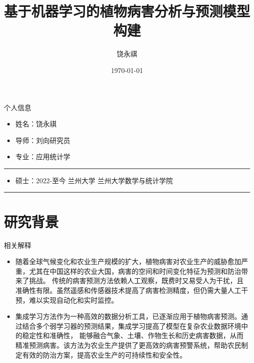 \documentclass{ldr-simple-gray}
\title{基于机器学习的植物病害分析与预测模型构建}
\subtitle{}
\author{饶永祺}
\institute[]
{
导师：刘向研究员\\
兰州大学\quad 数学与统计学院
}
\date{\today}
\begin{document}
\frame{\titlepage}


\begin{frame}{个人信息}

    \begin{itemize}
        \item 姓名：饶永祺
        \item 导师：刘向研究员
        \item 专业：应用统计学
    \end{itemize}

    \qquad \noindent\rule[0.25\baselineskip]{0.9\textwidth}{1pt}

    \begin{itemize}
        \item 硕士：2022-至今 \quad 兰州大学 \quad 兰州大学数学与统计学院
    \end{itemize}

    \qquad \noindent\rule[0.25\baselineskip]{0.9\textwidth}{1pt}

\end{frame}


\section{研究背景}

\begin{frame}{相关解释}
    \begin{itemize}
        \item 随着全球气候变化和农业生产规模的扩大，植物病害对农业生产的威胁愈加严重，尤其在中国这样的农业大国，病害的空间和时间变化特征为预测和防治带来了挑战。
        传统的病害预测方法依赖人工观察，既费时又易受人为干扰，且准确性有限。虽然遥感和传感器技术提高了病害检测精度，但仍需大量人工干预，难以实现自动化和实时监控。

        \item 集成学习方法作为一种高效的数据分析工具，已逐渐应用于植物病害预测。通过结合多个弱学习器的预测结果，集成学习提高了模型在复杂农业数据环境中的稳定性和准确性，
        能够融合气象、土壤、作物生长和历史病害数据，从而精准预测病害。该方法为农业生产提供了更高效的病害预警系统，帮助农民制定有效的防治方案，提高农业生产的可持续性和安全性。
    \end{itemize}
    
\end{frame}
\end{document}

